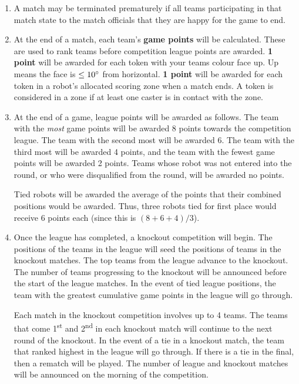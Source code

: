 \begin{enumerate}
\item A match may be terminated prematurely if all teams participating in that match state to the match officials that they are happy for the game to end.

\item At the end of a match, each team's \textbf{game points} will be calculated.
      These are used to rank teams before competition league points are awarded.
      \textbf{1 point} will be awarded for each token with your teams colour face up.
      Up means the face is $\leq 10\degree$ from horizontal.
      \textbf{1 point} will be awarded for each token in a robot's allocated scoring zone when a match ends.
      A token is considered in a zone if at least one caster is in contact with the zone.

\item At the end of a game, league points will be awarded as follows.
      The team with the \emph{most} game points will be awarded 8 points towards the competition league.
      The team with the second most will be awarded 6.
      The team with the third most will be awarded 4 points, and the team with the fewest game points will be awarded 2 points.
      Teams whose robot was not entered into the round, or who were disqualified from the round, will be awarded no points.

      Tied robots will be awarded the average of the points that their combined positions would be awarded.
      Thus, three robots tied for first place would receive 6 points each (since this is $(8+6+4)/3$).

\item Once the league has completed, a knockout competition will begin.
      The positions of the teams in the league will seed the positions of teams in the knockout matches.
      The top teams from the league advance to the knockout.
      The number of teams progressing to the knockout will be announced before the start of the league matches.
      In the event of tied league positions, the team with the greatest cumulative game points in the league will go through.

      Each match in the knockout competition involves up to 4 teams.
      The teams that come 1\textsuperscript{st} and 2\textsuperscript{nd} in each knockout match will continue to the next round of the knockout.
      In the event of a tie in a knockout match, the team that ranked highest in the league will go through.
      If there is a tie in the final, then a rematch will be played.
      The number of league and knockout matches will be announced on the morning of the competition.

\end{enumerate}
